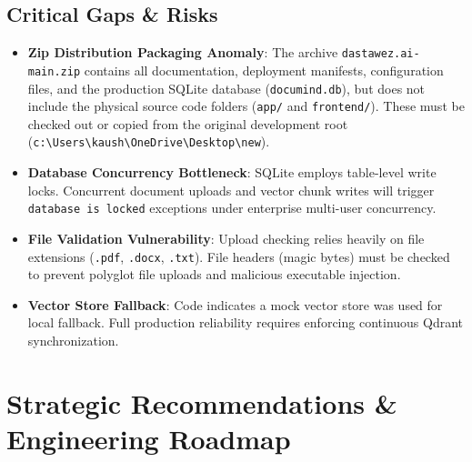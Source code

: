 \documentclass[11pt,a4paper]{article}
\begin{document}
\subsection{Critical Gaps \& Risks}
\begin{itemize}[leftmargin=*]
    \item[\textcolor{alertred}{\textbf{!}}] \textbf{Zip Distribution Packaging Anomaly}: The archive \texttt{dastawez.ai-main.zip} contains all documentation, deployment manifests, configuration files, and the production SQLite database (\texttt{documind.db}), but does not include the physical source code folders (\texttt{app/} and \texttt{frontend/}). These must be checked out or copied from the original development root (\texttt{c:\textbackslash Users\textbackslash kaush\textbackslash OneDrive\textbackslash Desktop\textbackslash new}).
    \item[\textcolor{alertred}{\textbf{!}}] \textbf{Database Concurrency Bottleneck}: SQLite employs table-level write locks. Concurrent document uploads and vector chunk writes will trigger \texttt{database is locked} exceptions under enterprise multi-user concurrency.
    \item[\textcolor{alertred}{\textbf{!}}] \textbf{File Validation Vulnerability}: Upload checking relies heavily on file extensions (\texttt{.pdf}, \texttt{.docx}, \texttt{.txt}). File headers (magic bytes) must be checked to prevent polyglot file uploads and malicious executable injection.
    \item[\textcolor{alertred}{\textbf{!}}] \textbf{Vector Store Fallback}: Code indicates a mock vector store was used for local fallback. Full production reliability requires enforcing continuous Qdrant synchronization.
\end{itemize}

\section{Strategic Recommendations \& Engineering Roadmap}
\end{document}
